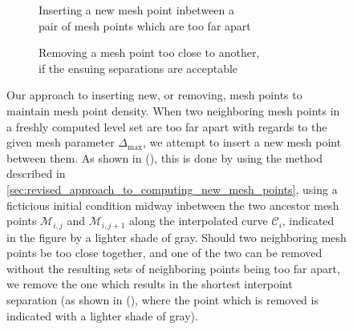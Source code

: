 \begin{figure}[htpb]
    \centering
    \begin{subfigure}[b]{0.475\textwidth}
        \centering
        \resizebox{0.9\linewidth}{!}%
        {}
        \caption[]{{\small Inserting a new mesh point inbetween a
        \\\phantom{(a)} pair of mesh points which are too far apart}}
        \label{fig:mesh_management_pure_insertion}
    \end{subfigure}
    \begin{subfigure}[b]{0.475\textwidth}
        \centering
        \resizebox{0.9\linewidth}{!}%
        {}
        \caption[]{{\small Removing a mesh point too close to another,
        \\\phantom{(b)} if the ensuing separations are acceptable}}
        \label{fig:mesh_management_pure_deletion}
    \end{subfigure}
    \caption[Our approach to inserting new, or removing, mesh points to
    maintain mesh point density]
    {Our approach to inserting new, or removing, mesh points to maintain
        mesh point density. When two neighboring mesh points in a freshly
        computed level set are too far apart with regards to the given mesh
        parameter $\Delta_{\max}$, we attempt to insert a new mesh point
        between them. As shown in
        (), this is done by using
        the method described in
        \cref{sec:revised_approach_to_computing_new_mesh_points}, using a
        ficticious initial condition midway inbetween the two ancestor mesh
        points $\mathcal{M}_{i,j}$ and $\mathcal{M}_{i,j+1}$ along the
        interpolated curve $\mathcal{C}_{i}$, indicated in the figure by
        a lighter shade of gray. Should two neighboring mesh points
        be too close together, and one of the two can be removed without the
        resulting sets of neighboring points being too far apart, we remove
        the one which results in the shortest interpoint separation (as shown
        in (), where the point
        which is removed is indicated with a lighter shade of gray).
    }
    \label{fig:mesh_management_insertion_and_deletion}
\end{figure}
